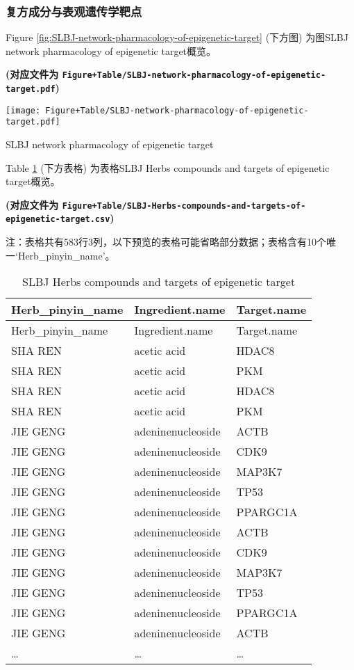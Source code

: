 \documentclass[
]{article}
\begin{document}
\hypertarget{ux590dux65b9ux6210ux5206ux4e0eux8868ux89c2ux9057ux4f20ux5b66ux9776ux70b9}{%
\subsubsection{复方成分与表观遗传学靶点}\label{ux590dux65b9ux6210ux5206ux4e0eux8868ux89c2ux9057ux4f20ux5b66ux9776ux70b9}}

Figure \ref{fig:SLBJ-network-pharmacology-of-epigenetic-target} (下方图) 为图SLBJ network pharmacology of epigenetic target概览。

\textbf{(对应文件为 \texttt{Figure+Table/SLBJ-network-pharmacology-of-epigenetic-target.pdf})}

\def\@captype{figure}
\begin{center}
\texttt{[image: Figure+Table/SLBJ-network-pharmacology-of-epigenetic-target.pdf]}
\caption{SLBJ network pharmacology of epigenetic target}\label{fig:SLBJ-network-pharmacology-of-epigenetic-target}
\end{center}

Table \ref{tab:SLBJ-Herbs-compounds-and-targets-of-epigenetic-target} (下方表格) 为表格SLBJ Herbs compounds and targets of epigenetic target概览。

\textbf{(对应文件为 \texttt{Figure+Table/SLBJ-Herbs-compounds-and-targets-of-epigenetic-target.csv})}

\begin{center}\begin{tcolorbox}[colback=gray!10, colframe=gray!50, width=0.9\linewidth, arc=1mm, boxrule=0.5pt]注：表格共有583行3列，以下预览的表格可能省略部分数据；表格含有10个唯一`Herb\_pinyin\_name'。
\end{tcolorbox}
\end{center}

\begin{longtable}[]{@{}lll@{}}
\caption{\label{tab:SLBJ-Herbs-compounds-and-targets-of-epigenetic-target}SLBJ Herbs compounds and targets of epigenetic target}\tabularnewline
\toprule
Herb\_pinyin\_name & Ingredient.name & Target.name\tabularnewline
\midrule
\endfirsthead
\toprule
Herb\_pinyin\_name & Ingredient.name & Target.name\tabularnewline
\midrule
\endhead
SHA REN & acetic acid & HDAC8\tabularnewline
SHA REN & acetic acid & PKM\tabularnewline
SHA REN & acetic acid & HDAC8\tabularnewline
SHA REN & acetic acid & PKM\tabularnewline
JIE GENG & adeninenucleoside & ACTB\tabularnewline
JIE GENG & adeninenucleoside & CDK9\tabularnewline
JIE GENG & adeninenucleoside & MAP3K7\tabularnewline
JIE GENG & adeninenucleoside & TP53\tabularnewline
JIE GENG & adeninenucleoside & PPARGC1A\tabularnewline
JIE GENG & adeninenucleoside & ACTB\tabularnewline
JIE GENG & adeninenucleoside & CDK9\tabularnewline
JIE GENG & adeninenucleoside & MAP3K7\tabularnewline
JIE GENG & adeninenucleoside & TP53\tabularnewline
JIE GENG & adeninenucleoside & PPARGC1A\tabularnewline
JIE GENG & adeninenucleoside & ACTB\tabularnewline
\ldots{} & \ldots{} & \ldots{}\tabularnewline
\bottomrule
\end{longtable}
\end{document}
